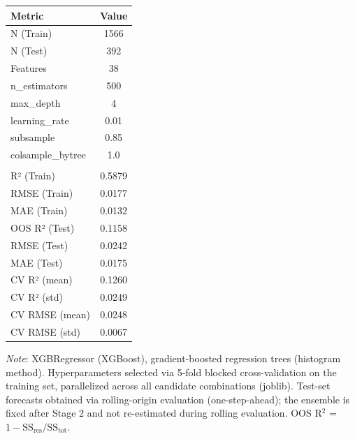 \begin{tabular}{lc}
  \toprule
  \textbf{Metric} & \textbf{Value} \\ 
  \midrule
  N (Train) & 1566 \\ 
  N (Test) & 392 \\ 
  Features & 38 \\ 
  n\_estimators & 500 \\ 
  max\_depth & 4 \\ 
  learning\_rate & 0.01 \\ 
  subsample & 0.85 \\ 
  colsample\_bytree & 1.0 \\ 
   &  \\ 
  R² (Train) & 0.5879 \\ 
  RMSE (Train) & 0.0177 \\ 
  MAE (Train) & 0.0132 \\ 
  OOS R² (Test) & 0.1158 \\ 
  RMSE (Test) & 0.0242 \\ 
  MAE (Test) & 0.0175 \\ 
  CV R² (mean) & 0.1260 \\ 
  CV R² (std) & 0.0249 \\ 
  CV RMSE (mean) & 0.0248 \\ 
  CV RMSE (std) & 0.0067 \\ 
  \bottomrule
\end{tabular}
\par\vspace{4pt}
\begin{minipage}{\linewidth}
  \footnotesize \textit{Note}: XGBRegressor (XGBoost), gradient-boosted regression trees (histogram method). Hyperparameters selected via 5-fold blocked cross-validation on the training set, parallelized across all candidate combinations (joblib). Test-set forecasts obtained via rolling-origin evaluation (one-step-ahead); the ensemble is fixed after Stage 2 and not re-estimated during rolling evaluation. OOS R$^2$ = $1 - \text{SS}_{\text{res}} / \text{SS}_{\text{tot}}$.
\end{minipage}